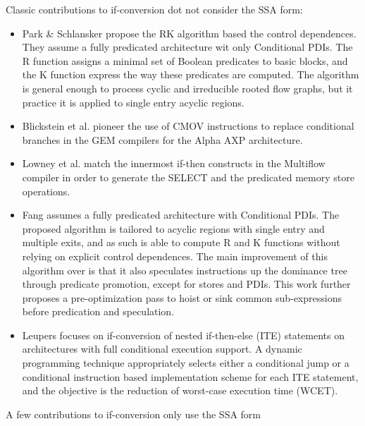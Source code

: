 Classic contributions to if-conversion
dot not consider the SSA form: \begin{itemize}


\item Park \& Schlansker \cite{Park:1991:TR58} propose the RK algorithm based
the control dependences. They assume a fully predicated architecture wit only
Conditional PDIs. The R function assigns a minimal set of Boolean predicates to
basic blocks, and the K function express the way these predicates are computed.
The algorithm is general enough to process cyclic and irreducible rooted flow
graphs, but it practice it is applied to single entry acyclic regions.

\item Blickstein et al. \cite{Blickstein:1992:DTJ} pioneer the use of CMOV
instructions to replace conditional branches in the GEM compilers for the Alpha
AXP architecture.

\item Lowney et al. \cite{Lowney:1993:JS} match the innermost if-then constructs
in the Multiflow compiler in order to generate the SELECT and the predicated
memory store operations.

\item Fang \cite{Fang:1996:LCPC} assumes a fully predicated architecture with
Conditional PDIs. The proposed algorithm is tailored to acyclic regions with
single entry and multiple exits, and as such is able to compute R and K
functions without relying on explicit control dependences.  The main improvement
of this algorithm over \cite{Park:1991:TR58} is that it also speculates
instructions up the dominance tree through predicate promotion, except for
stores and PDIs. This work further proposes a pre-optimization pass to hoist or
sink common sub-expressions before predication and speculation.

\item Leupers \cite{Leupers:1999:DATE} focuses on if-conversion of nested
if-then-else (ITE) statements on architectures with full conditional execution
support. A dynamic programming technique appropriately selects either a
conditional jump or a conditional instruction based implementation scheme for
each ITE statement, and the objective is the reduction of worst-case execution
time (WCET).

\end{itemize} A few contributions to if-conversion only use the SSA form
